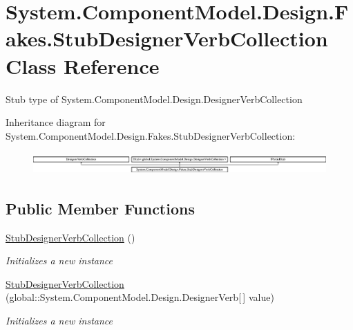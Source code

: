\hypertarget{class_system_1_1_component_model_1_1_design_1_1_fakes_1_1_stub_designer_verb_collection}{\section{System.\-Component\-Model.\-Design.\-Fakes.\-Stub\-Designer\-Verb\-Collection Class Reference}
\label{class_system_1_1_component_model_1_1_design_1_1_fakes_1_1_stub_designer_verb_collection}
}


Stub type of System.\-Component\-Model.\-Design.\-Designer\-Verb\-Collection 


Inheritance diagram for System.\-Component\-Model.\-Design.\-Fakes.\-Stub\-Designer\-Verb\-Collection\-:\begin{figure}[H]
\begin{center}
\leavevmode
\includegraphics[height=0.860215cm]{class_system_1_1_component_model_1_1_design_1_1_fakes_1_1_stub_designer_verb_collection}
\end{center}
\end{figure}
\subsection*{Public Member Functions}
\begin{DoxyCompactItemize}
\item 
\hyperlink{class_system_1_1_component_model_1_1_design_1_1_fakes_1_1_stub_designer_verb_collection_af8f68891995e292722406b4c481c3dd4}{Stub\-Designer\-Verb\-Collection} ()
\begin{DoxyCompactList}\small\item\em Initializes a new instance\end{DoxyCompactList}\item 
\hyperlink{class_system_1_1_component_model_1_1_design_1_1_fakes_1_1_stub_designer_verb_collection_a38d660d390569fda30941919feec3777}{Stub\-Designer\-Verb\-Collection} (global\-::\-System.\-Component\-Model.\-Design.\-Designer\-Verb\mbox{[}$\,$\mbox{]} value)
\begin{DoxyCompactList}\small\item\em Initializes a new instance\end{DoxyCompactList}\end{DoxyCompactItemize}

